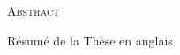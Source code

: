 \newpage
\begin{center}
  {\Huge \textsc{Abstract}}
\end{center}
%
\noindent
%
Résumé de la Thèse en anglais

\newpage
\null
\thispagestyle{empty}
\newpage
